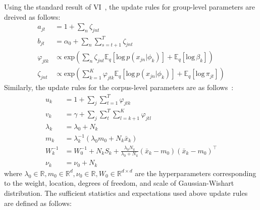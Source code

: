 \documentclass{article}
\begin{document}
Using the standard result of VI~\cite{DBLP:journals/jei/BishopN07, 10.1214/06-BA104, DBLP:journals/jmlr/WangPB11}, the update rules for group-level parameters are dreived as follows:
\begin{align}
\label{eq:doc_update:a} a_{jt} &= \textstyle 1 +  \sum_{n}\zeta_{jnt} \\
\label{eq:doc_update:b} b_{jt} &= \textstyle \alpha_{0} +  \sum_{n}\sum^{T}_{s=t+1}\zeta_{jnt} \\
\label{eq:doc_update:varphi} \varphi_{jtk} &\propto \text{exp}(\textstyle \sum_{n}\zeta_{jnt}\mathbb{E}_{q}[\text{log}\,p(x_{jn}|\phi_{k})] + \mathbb{E}_{q}[\text{log}\,\beta_{k}]) \\
\label{eq:doc_update:zeta} \zeta_{jnt} &\propto \text{exp}(\textstyle \sum_{k=1}^{K} \varphi_{jtk} \mathbb{E}_{q}[\text{log}\,p(x_{jn}|\phi_{k})] + \mathbb{E}_{q}[\text{log}\,\pi_{jt}])
\end{align}
Similarly, the update rules for the corpus-level parameters are as follows~\cite{DBLP:journals/jei/BishopN07}:
\begin{align}
\label{eq:corpus_update:u} u_{k} &= 1 + \textstyle \sum_{j}\sum_{t=1}^{T} \varphi_{jtk} \\
\label{eq:corpus_update:v} v_{k} &= \gamma + \textstyle \sum_{j}\sum_{t}^{T}\sum_{l=k+1}^{K} \varphi_{jtl} \\
\label{eq:corpus_update:lambda} \lambda_{k} &= \lambda_{0} + N_{k} \\
\label{eq:corpus_update:m} m_{k} &= \lambda_{k}^{-1} (\lambda_{0}m_{0} + N_{k}\bar{x}_{k}) \\
\label{eq:corpus_update:W} W_{k}^{-1} &= W_{0}^{-1} + N_{k}S_{k} + \frac{\lambda_{0}N_{k}}{\lambda_{0} + N_{k}} (\bar{x}_{k} - m_{0})(\bar{x}_{k} - m_{0})^{\intercal} \\
\label{eq:corpus_update:nu} \nu_{k} &= \nu_{0} + N_{k}
\end{align}
where $\lambda_{0}\in\mathbb{R}, m_{0}\in\mathbb{R}^{d}, \nu_{0}\in\mathbb{R}, W_{0}\in\mathbb{R}^{d\times d}$ are the hyperparameters corresponding to the weight, location, degrees of freedom, and scale of Gaussian-Wishart distribution. The sufficient statistics and expectations used above update rules are defined as follows:
\end{document}
